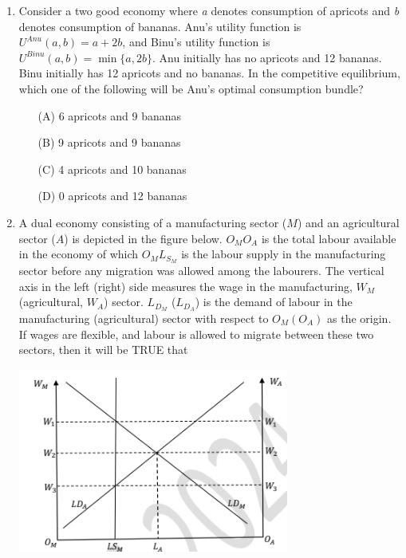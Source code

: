 \documentclass[journal,12pt,onecolumn]{exam}
\theoremstyle{remark}
\begin{document}
\begin{enumerate}
\item Consider a two good economy where \textit{a} denotes consumption of apricots and \textit{b} denotes consumption of bananas. Anu's utility function is \( U^{Anu}(a,b) = a + 2b \), and Binu's utility function is \( U^{Binu}(a,b) = \min\{a, 2b\} \). Anu initially has no apricots and 12 bananas. Binu initially has 12 apricots and no bananas. In the competitive equilibrium, which one of the following will be Anu's optimal consumption bundle?

\begin{enumerate}
    \item[(A)] 6 apricots and 9 bananas
    \item[(B)] 9 apricots and 9 bananas
    \item[(C)] 4 apricots and 10 bananas
    \item[(D)] 0 apricots and 12 bananas
\end{enumerate}
\newpage

\item  A dual economy consisting of a manufacturing sector (\(M\)) and an agricultural sector (\(A\)) is depicted in the figure below. \(O_M O_A\) is the total labour available in the economy of which \(O_M L_{S_M}\) is the labour supply in the manufacturing sector before any migration was allowed among the labourers. The vertical axis in the left (right) side measures the wage in the manufacturing, \(W_M\) (agricultural, \(W_A\)) sector. \(L_{D_M}\) (\(L_{D_A}\)) is the demand of labour in the manufacturing (agricultural) sector with respect to \(O_M (O_A)\) as the origin. If wages are flexible, and labour is allowed to migrate between these two sectors, then it will be TRUE that

\begin{center}
\includegraphics[width=0.7\textwidth]{figs/a3q47.png}
\end{center}


\end{enumerate}
\end{document}
